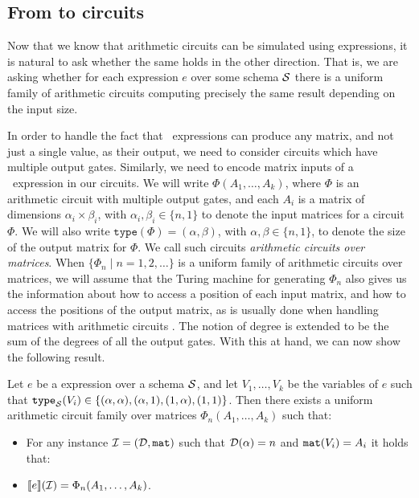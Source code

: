 \subsection{From \langfor to circuits}\label{subsec:formatlangtoac}

Now that we know that arithmetic circuits can be simulated using \langfor expressions, it is natural to ask whether the same holds in the other direction. That is, we are asking whether for each \langfor expression $e$ over some schema $\mathcal{S}$ there is a uniform family of arithmetic circuits computing precisely the same result depending on the input size. 

In order to handle the fact that \langfor\ expressions can produce any matrix, and not just a single value, as their output, we need to consider circuits which have multiple output gates. Similarly, we need to encode matrix inputs of a \langfor\ expression in our circuits. We will write $\Phi(A_1,\ldots ,A_k)$, where $\Phi$ is an arithmetic circuit with multiple output gates, and each $A_i$ is a matrix of dimensions $\alpha_i\times \beta_i$, with $\alpha_i,\beta_i \in \{n,1\}$ to denote the input matrices for a circuit $\Phi$. We will also write $\texttt{type}(\Phi)=(\alpha,\beta)$, with $\alpha,\beta\in \{n,1\}$, to denote the size of the output matrix for $\Phi$. We call such circuits \textit{arithmetic circuits over matrices}. When $\{\Phi_n\mid n=1,2,\ldots\}$ is a uniform family of arithmetic circuits over matrices, we will assume that the Turing machine for generating $\Phi_n$ also gives us the information about how to access a position of each input matrix, and how to access the positions of the output matrix, as is usually done when handling matrices with arithmetic circuits \cite{Raz02}. The notion of degree is extended to be the sum of the degrees of all the output gates. With this  at hand, we can now show the following result.

\begin{theorem}
\label{th-ml-to-circuits}
Let $e$ be a \langfor expression over a schema $\mathcal{S}$, and let $V_1,\ldots ,V_k$ be the variables of $e$ such that $\texttt{type}_{\mathcal{S}}(V_i)\in \{(\alpha,\alpha), (\alpha,1), (1,\alpha), (1,1)\}$. Then there exists a uniform arithmetic circuit family over matrices $\Phi_n(A_1,\ldots ,A_k)$ such that:
\begin{itemize}
\item For any instance $\mathcal{I} = (\mathcal{D},\texttt{mat})$ such that $\mathcal{D}(\alpha) = n$ and $\texttt{mat}(V_i) = A_i$ it holds that:
\item $\llbracket e \rrbracket(\mathcal{I}) = \Phi_n(A_1,\ldots ,A_k)$.
\end{itemize}
\end{theorem}

